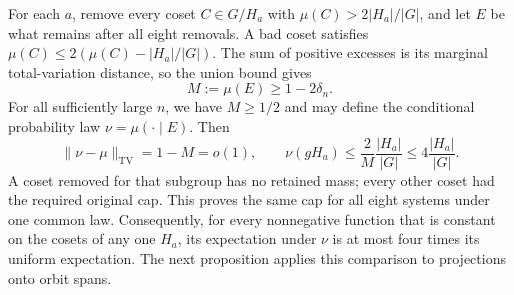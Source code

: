 \documentclass[11pt]{article}
\theoremstyle{remark}
\numberwithin{equation}{section}
\begin{document}
For each \(a\), remove every coset \(C\in G/H_a\) with \(\mu(C)>2|H_a|/|G|\), and let \(E\) be what remains after all eight removals. A bad coset satisfies
\(\mu(C)\le2(\mu(C)-|H_a|/|G|)\).
The sum of positive excesses is its marginal total-variation distance, so the union bound gives
\[
 M:=\mu(E)\ge1-2\delta_n.
\]
For all sufficiently large \(n\), we have \(M\ge1/2\) and may define the conditional probability law \(\nu=\mu(\cdot\mid E)\). Then
\begin{equation}\label{eq:h-11}
 \|\nu-\mu\|_{\mathrm{TV}}=1-M=o(1),
 \qquad
 \nu(gH_a)\le\frac2M\frac{|H_a|}{|G|}
             \le4\frac{|H_a|}{|G|}.
\end{equation}
A coset removed for that subgroup has no retained mass; every other coset had the required original cap. This proves the same cap for all eight systems under one common law. Consequently, for every nonnegative function that is constant on the cosets of any one \(H_a\), its expectation under \(\nu\) is at most four times its uniform expectation. The next proposition applies this comparison to projections onto orbit spans.
\end{document}

